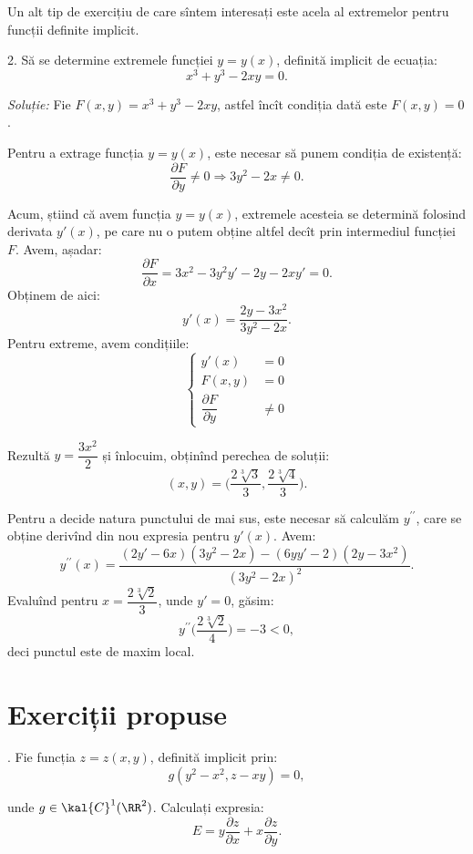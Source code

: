 \vspace{0.5cm}

Un alt tip de exercițiu de care sîntem interesați este acela al extremelor pentru
funcții definite implicit.

2. Să se determine extremele funcției $ y = y(x) $, definită implicit de ecuația:
\[
  x^3 + y^3 - 2xy = 0.
\]

\emph{Soluție:} Fie $ F(x, y) = x^3 + y^3 - 2xy $, astfel încît condiția dată
este $ F(x, y) = 0 $.

Pentru a extrage funcția $ y = y(x) $, este necesar să punem condiția
de existență:
\[
  \dfrac{\partial F}{\partial y} \neq 0 \Rightarrow 3y^2 - 2x \neq 0.
\]

Acum, știind că avem funcția $ y = y(x) $, extremele acesteia se determină
folosind derivata $ y'(x) $, pe care nu o putem obține altfel decît prin
intermediul funcției $ F $. Avem, așadar:
\[
  \frac{\partial F}{\partial x} = 3x^2 - 3y^2 y' - 2y - 2x y' = 0.
\]
Obținem de aici:
\[
  y'(x) = \frac{2y - 3x^2}{3y^2 - 2x}.
\]
Pentru extreme, avem condițiile:
\[
  \begin{cases}
    y'(x) &= 0 \\
    F(x, y) &= 0 \\
    \dfrac{\partial F}{\partial y} &\neq 0
  \end{cases}
\]

Rezultă $ y = \dfrac{3x^2}{2} $ și înlocuim, obținînd perechea de soluții:
\[
  (x, y) = \Big( \dfrac{2\sqrt[3]{3}}{3}, \dfrac{2\sqrt[3]{4}}{3} \Big).
\]

Pentru a decide natura punctului de mai sus, este necesar să calculăm
$ y^{\prime\prime} $, care se obține derivînd din nou expresia pentru $ y'(x) $.
Avem:
\[
  y^{\prime\prime}(x) = \frac{(2y' - 6x)(3y^2 - 2x) - (6yy' - 2)(2y - 3x^2)}{(3y^2 - 2x)^2}.
\]
Evaluînd pentru $ x = \dfrac{2 \sqrt[3]{2}}{3} $, unde $ y' = 0 $, găsim:
\[
  y^{\prime\prime}\Big( \dfrac{2 \sqrt[3]{2}}{4} \Big) = -3 < 0,
\]
deci punctul este de maxim local.


\section{Exerciții propuse}

\indent{}. Fie funcția $ z = z(x, y) $, definită implicit prin:
\[
  g(y^2 - x^2, z - xy) = 0,
\]

unde $ g \in \kal{C}^1(\RR^2) $. Calculați expresia:
\[
  E = y \dfrac{\partial z}{\partial x} + x \dfrac{\partial z}{\partial y}.
\]

